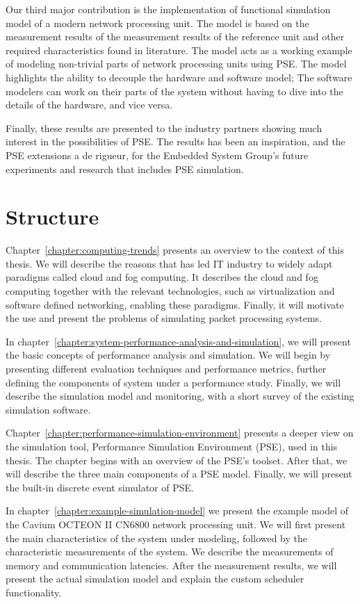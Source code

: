 Our third major contribution is the implementation of functional simulation model of a modern network processing unit. The model is based on the measurement results of the measurement results of the reference unit and other required characteristics found in literature. The model acts as a working example of modeling non-trivial parts of network processing units using PSE. The model highlights the ability to decouple the hardware and software model; The software modelers can work on their parts of the system without having to dive into the details of the hardware, and vice versa.

Finally, these results are presented to the industry partners showing much interest in the possibilities of PSE. The results has been an inspiration, and the PSE extensions a de rigueur, for the Embedded System Group's future experiments and research that includes PSE simulation.

\section{Structure}
Chapter~\ref{chapter:computing-trends} presents an overview to the context of this thesis. We will describe the reasons that has led IT industry to widely adapt paradigms called cloud and fog computing. It describes the cloud and fog computing together with the relevant technologies, such as virtualization and software defined networking, enabling these paradigms. Finally, it will motivate the use and present the problems of simulating packet processing systems.

In chapter~\ref{chapter:system-performance-analysis-and-simulation}, we will present the basic concepts of performance analysis and simulation. We will begin by presenting different evaluation techniques and performance metrics, further defining the components of system under a performance study. Finally, we will describe the simulation model and monitoring, with a short survey of the existing simulation software.

Chapter~\ref{chapter:performance-simulation-environment} presents a deeper view on the simulation tool, Performance Simulation Environment (PSE), used in this thesis. The chapter begins with an overview of the PSE's toolset. After that, we will describe the three main components of a PSE model. Finally, we will present the built-in discrete event simulator of PSE.

In chapter~\ref{chapter:example-simulation-model} we present the example model of the Cavium OCTEON II CN6800 network processing unit. We will first present the main characteristics of the system under modeling, followed by the characteristic measurements of the system. We describe the measurements of memory and communication latencies. After the measurement results, we will present the actual simulation model and explain the custom scheduler functionality.

